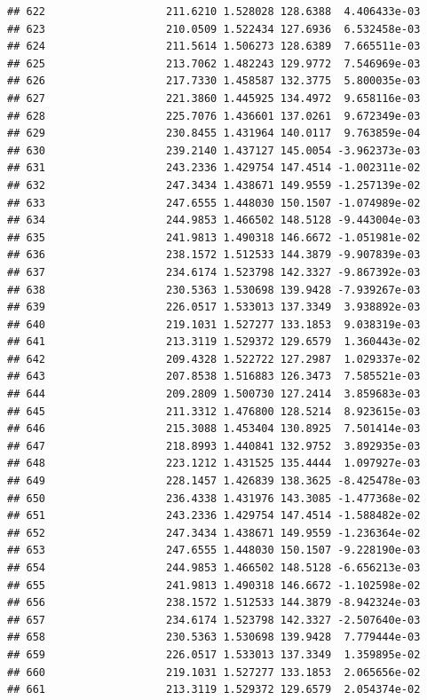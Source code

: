 \documentclass[
]{article}
\begin{document}
\begin{verbatim}
## 622                   211.6210 1.528028 128.6388  4.406433e-03
## 623                   210.0509 1.522434 127.6936  6.532458e-03
## 624                   211.5614 1.506273 128.6389  7.665511e-03
## 625                   213.7062 1.482243 129.9772  7.546969e-03
## 626                   217.7330 1.458587 132.3775  5.800035e-03
## 627                   221.3860 1.445925 134.4972  9.658116e-03
## 628                   225.7076 1.436601 137.0261  9.672349e-03
## 629                   230.8455 1.431964 140.0117  9.763859e-04
## 630                   239.2140 1.437127 145.0054 -3.962373e-03
## 631                   243.2336 1.429754 147.4514 -1.002311e-02
## 632                   247.3434 1.438671 149.9559 -1.257139e-02
## 633                   247.6555 1.448030 150.1507 -1.074989e-02
## 634                   244.9853 1.466502 148.5128 -9.443004e-03
## 635                   241.9813 1.490318 146.6672 -1.051981e-02
## 636                   238.1572 1.512533 144.3879 -9.907839e-03
## 637                   234.6174 1.523798 142.3327 -9.867392e-03
## 638                   230.5363 1.530698 139.9428 -7.939267e-03
## 639                   226.0517 1.533013 137.3349  3.938892e-03
## 640                   219.1031 1.527277 133.1853  9.038319e-03
## 641                   213.3119 1.529372 129.6579  1.360443e-02
## 642                   209.4328 1.522722 127.2987  1.029337e-02
## 643                   207.8538 1.516883 126.3473  7.585521e-03
## 644                   209.2809 1.500730 127.2414  3.859683e-03
## 645                   211.3312 1.476800 128.5214  8.923615e-03
## 646                   215.3088 1.453404 130.8925  7.501414e-03
## 647                   218.8993 1.440841 132.9752  3.892935e-03
## 648                   223.1212 1.431525 135.4444  1.097927e-03
## 649                   228.1457 1.426839 138.3625 -8.425478e-03
## 650                   236.4338 1.431976 143.3085 -1.477368e-02
## 651                   243.2336 1.429754 147.4514 -1.588482e-02
## 652                   247.3434 1.438671 149.9559 -1.236364e-02
## 653                   247.6555 1.448030 150.1507 -9.228190e-03
## 654                   244.9853 1.466502 148.5128 -6.656213e-03
## 655                   241.9813 1.490318 146.6672 -1.102598e-02
## 656                   238.1572 1.512533 144.3879 -8.942324e-03
## 657                   234.6174 1.523798 142.3327 -2.507640e-03
## 658                   230.5363 1.530698 139.9428  7.779444e-03
## 659                   226.0517 1.533013 137.3349  1.359895e-02
## 660                   219.1031 1.527277 133.1853  2.065656e-02
## 661                   213.3119 1.529372 129.6579  2.054374e-02

\end{verbatim}
\end{document}
